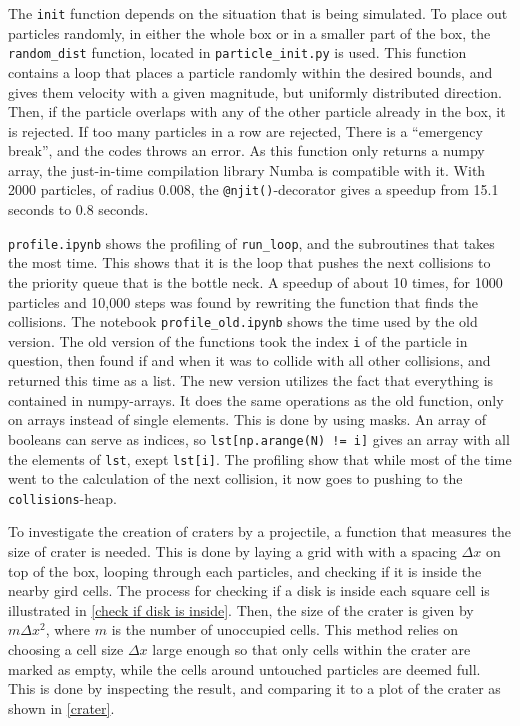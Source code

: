 \documentclass{article}
\begin{document}
    The \verb|init| function depends on the situation that is being simulated.
    To place out particles randomly, in either the whole box or in a smaller part of the box, the \verb|random_dist| function, located in \verb|particle_init.py| is used.
    This function contains a loop that places a particle randomly within the desired bounds, and gives them velocity with a given magnitude, but uniformly distributed direction.
    Then, if the particle overlaps with any of the other particle already in the box, it is rejected.
    If too many particles in a row are rejected, There is a ``emergency break'', and the codes throws an error.
    As this function only returns a numpy array, the just-in-time compilation library Numba is compatible with it.
    With 2000 particles, of radius 0.008, the \verb|@njit()|-decorator gives a speedup from 15.1 seconds to 0.8 seconds.

    \verb|profile.ipynb| shows the profiling of \verb|run_loop|, and the subroutines that takes the most time.
    This shows that it is the loop that pushes the next collisions to the priority queue that is the bottle neck.
    A speedup of about 10 times, for 1000 particles and 10,000 steps was found by rewriting the function that finds the collisions.
    The notebook \verb|profile_old.ipynb| shows the time used by the old version.
    The old version of the functions took the index \verb|i| of the particle in question, then found if and when it was to collide with all other collisions, and returned this time as a list.
    The new version utilizes the fact that everything is contained in numpy-arrays.
    It does the same operations as the old function, only on arrays instead of single elements.
    This is done by using masks.
    An array of booleans can serve as indices, so \verb|lst[np.arange(N) != i]| gives an array with all the elements of \verb|lst|, exept \verb|lst[i]|.
    The profiling show that while most of the time went to the calculation of the next collision, it now goes to pushing to the \verb|collisions|-heap.

    To investigate the creation of craters by a projectile, a function that measures the size of crater is needed.
    This is done by laying a grid with with a spacing $\Delta x$ on top of the box, looping through each particles, and checking if it is inside the nearby gird cells.
    The process for checking if a disk is inside each square cell is illustrated in \autoref{check if disk is inside}.
    Then, the size of the crater is given by $m \Delta x^2$, where $m$ is the number of unoccupied cells.
    This method relies on choosing a cell size $\Delta x$ large enough so that only cells within the crater are marked as empty, while the cells around untouched particles are deemed full.
    This is done by inspecting the result, and comparing it to a plot of the crater as shown in \autoref{crater}.
\end{document}

